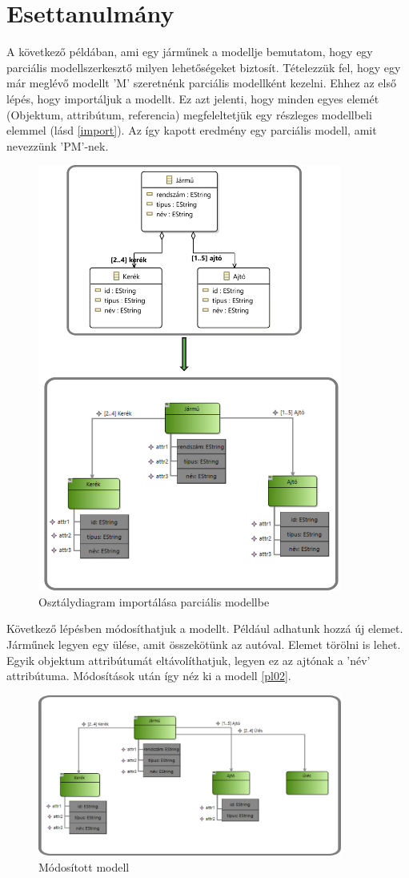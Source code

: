 \section{Esettanulmány}
A következő példában, ami egy járműnek a modellje bemutatom, hogy egy parciális modellszerkesztő milyen lehetőségeket biztosít. Tételezzük fel, hogy egy már meglévő modellt 'M' szeretnénk parciális modellként kezelni. Ehhez az első lépés, hogy importáljuk a modellt. Ez azt jelenti, hogy minden egyes elemét (Objektum, attribútum, referencia) megfeleltetjük egy részleges modellbeli elemmel (lásd \autoref{import}). Az így kapott eredmény egy parciális modell, amit nevezzünk 'PM'-nek.
\begin{figure}[!ht]
	\centering
	\includegraphics[width=100mm]{figures/pl01.pdf}
	\caption{Osztálydiagram importálása parciális modellbe} 
	\label{import}
\end{figure}
\par
Következő lépésben módosíthatjuk a modellt. Például adhatunk hozzá új elemet. Járműnek legyen egy ülése, amit összekötünk az autóval. Elemet törölni is lehet. Egyik objektum attribútumát eltávolíthatjuk, legyen ez az ajtónak a 'név' attribútuma. Módosítások után így néz ki a modell \autoref{pl02}.
\begin{figure}[!ht]
	\centering
	\includegraphics[width=100mm]{figures/pl02.pdf}
	\caption{Módosított modell} 
	\label{pl02}
\end{figure}
